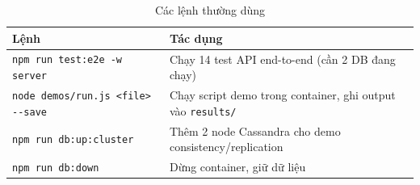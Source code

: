 \begin{table}[H]
\centering
\caption{Các lệnh thường dùng}
\begin{tabularx}{\linewidth}{|p{5.6cm}|X|}
\hline
\textbf{Lệnh} & \textbf{Tác dụng} \\ \hline
\texttt{npm run test:e2e -w server} & Chạy 14 test API end-to-end (cần 2 DB đang chạy) \\ \hline
\texttt{node demos/run.js <file> -{}-save} & Chạy script demo trong container, ghi output vào \texttt{results/} \\ \hline
\texttt{npm run db:up:cluster} & Thêm 2 node Cassandra cho demo consistency/replication \\ \hline
\texttt{npm run db:down} & Dừng container, giữ dữ liệu \\ \hline
\end{tabularx}
\end{table}
